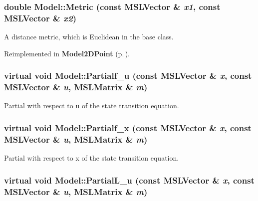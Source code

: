 \subsubsection{\setlength{\rightskip}{0pt plus 5cm}double Model::Metric (const {\bf MSLVector} \& {\em x1}, const {\bf MSLVector} \& {\em x2})\hspace{0.3cm}{\tt  [virtual]}}\label{classModel_a9}


A distance metric, which is Euclidean in the base class.



Reimplemented in {\bf Model2DPoint} {\rm (p.\,\pageref{classModel2DPoint_a4})}.
\subsubsection{\setlength{\rightskip}{0pt plus 5cm}virtual void Model::Partialf\_\-u (const {\bf MSLVector} \& {\em x}, const {\bf MSLVector} \& {\em u}, {\bf MSLMatrix} \& {\em m})\hspace{0.3cm}{\tt  [inline, virtual]}}\label{classModel_a11}


Partial with respect to u of the state transition equation.

\subsubsection{\setlength{\rightskip}{0pt plus 5cm}virtual void Model::Partialf\_\-x (const {\bf MSLVector} \& {\em x}, const {\bf MSLVector} \& {\em u}, {\bf MSLMatrix} \& {\em m})\hspace{0.3cm}{\tt  [inline, virtual]}}\label{classModel_a10}


Partial with respect to x of the state transition equation.

\subsubsection{\setlength{\rightskip}{0pt plus 5cm}virtual void Model::Partial\-L\_\-u (const {\bf MSLVector} \& {\em x}, const {\bf MSLVector} \& {\em u}, {\bf MSLMatrix} \& {\em m})\hspace{0.3cm}{\tt  [inline, virtual]}}\label{classModel_a14}


